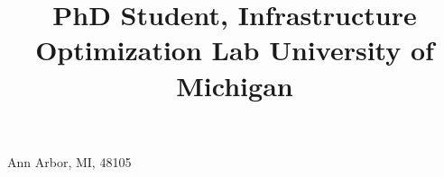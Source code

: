 

\title{\normalsize
	PhD Student, Infrastructure Optimization Lab \newline
	University of Michigan
}

\address{1205 Beal Ave}{Ann Arbor, MI, 48105}



\newcommand{\see}[1]{\hfill{\itshape\color{see}\footnotesize{}see #1}}

\newcommand{\br}{\ifinner, \else\\\fi}

\newcommand{\github}[1]{\href{https://github.com/tasseff/#1}{#1}}

\makeatletter
\def\@bibitem#1{%
	\def\mykey{#1}%
	\item\if@filesw\immediate\write\@auxout {\string\bibcite{#1}%
	{\the\value{\@listctr}}}\fi\ignorespaces}



\makeatother

\newlength{\bibliographysectionspacing}            %
\setlength{\bibliographysectionspacing}{.15in}
\newcommand{\bibsectiontitleformat}[1]{#1}         %


